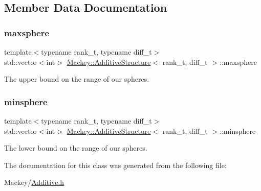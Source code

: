 \subsection{Member Data Documentation}
\mbox{\label{classMackey_1_1AdditiveStructure_a1d26ee2b19d9d66744ee4d79c302d9c4}} 
\subsubsection{\texorpdfstring{maxsphere}{maxsphere}}
{\footnotesize\ttfamily template$<$typename rank\+\_\+t, typename diff\+\_\+t$>$ \\
std\+::vector$<$int$>$ \hyperlink{classMackey_1_1AdditiveStructure}{Mackey\+::\+Additive\+Structure}$<$ rank\+\_\+t, diff\+\_\+t $>$\+::maxsphere}



The upper bound on the range of our spheres. 

\mbox{\label{classMackey_1_1AdditiveStructure_a1158af906d8bb5b9dcc7eed72367f25e}} 
\subsubsection{\texorpdfstring{minsphere}{minsphere}}
{\footnotesize\ttfamily template$<$typename rank\+\_\+t, typename diff\+\_\+t$>$ \\
std\+::vector$<$int$>$ \hyperlink{classMackey_1_1AdditiveStructure}{Mackey\+::\+Additive\+Structure}$<$ rank\+\_\+t, diff\+\_\+t $>$\+::minsphere}



The lower bound on the range of our spheres. 



The documentation for this class was generated from the following file\+:\begin{DoxyCompactItemize}
\item 
Mackey/\hyperlink{Additive_8h}{Additive.\+h}\end{DoxyCompactItemize}

